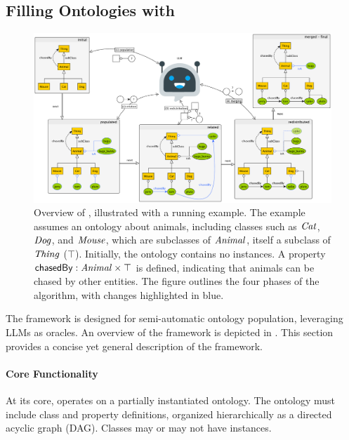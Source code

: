 \subsection{Filling Ontologies with \llmfkg}
\label{subsec:filling-ontologies-kgfiller}
%
\begin{figure}
    \centering
    \includegraphics[width=\linewidth]{figures/kgfiller/roadmap}
    \caption[Overview of \llmfkg{}]{%
        Overview of \llmfkg{}, illustrated with a running example.
        The example assumes an ontology about animals, including classes such as $\concept{Cat}$, $\concept{Dog}$, and $\concept{Mouse}$, which are subclasses of $\concept{Animal}$, itself a subclass of $\concept{Thing}$ (\(\top\)).
        Initially, the ontology contains no instances.
        A property $\relation{chasedBy} : \concept{Animal} \times \top$ is defined, indicating that animals can be chased by other entities.
        The figure outlines the four phases of the \llmfkg{} algorithm, with changes highlighted in blue.
    }
    \label{fig:roadmap}
\end{figure}

The \llmfkg{} framework is designed for semi-automatic ontology population, leveraging \glspl{LLM} as oracles.
%
An overview of the \llmfkg{} framework is depicted in .
%
This section provides a concise yet general description of the framework.

%
\paragraph{Core Functionality}
\label{par:core-functionality}

At its core, \llmfkg{} operates on a partially instantiated ontology.
%
The ontology must include class and property definitions, organized hierarchically as a directed acyclic graph (DAG).
%
Classes may or may not have instances.


